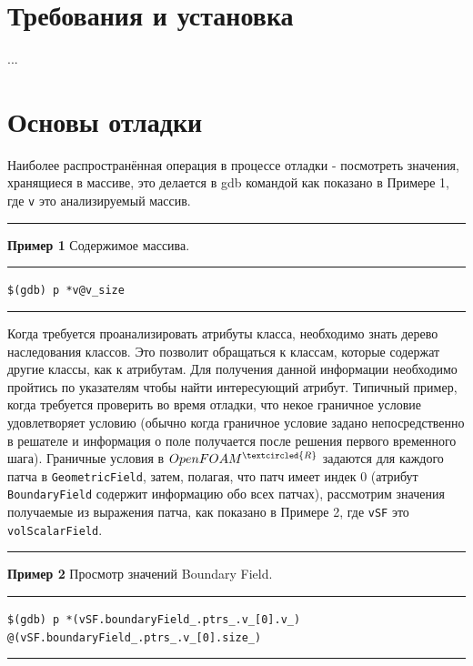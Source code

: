 \documentclass[a4paper,10pt]{book}
\begin{document}
                                                                                                            

\chapter{Требования и установка}

...

\chapter{Основы отладки}
Наиболее распространённая операция в процессе отладки - посмотреть значения, хранящиеся в массиве, это делается в gdb командой как
показано в Примере 1, где \texttt{v} это анализируемый массив.
\vspace{2 mm}

\hrule\smallskip
\textbf{Пример 1} Содержимое массива.
\smallskip\hrule
\vspace{2 mm}
\texttt{\$(gdb) p *v@v\_size}
\vspace{2 mm}
\smallskip\hrule
\vspace{2 mm}

Когда требуется проанализировать атрибуты класса, необходимо знать дерево наследования классов. Это позволит обращаться
к классам, которые содержат другие классы, как к атрибутам. Для получения данной информации необходимо пройтись по указателям
чтобы найти интересующий атрибут. Типичный пример, когда требуется проверить во время отладки, что некое граничное условие
удовлетворяет условию (обычно когда граничное условие задано непосредственно в решателе и информация о поле получается после решения
первого временного шага). Граничные условия в $OpenFOAM^{\tiny\textcircled{R}}$ задаются для каждого патча в \texttt{GeometricField},
 затем, полагая, что патч имеет индек 0 (атрибут \texttt{BoundaryField} содержит информацию обо всех патчах), рассмотрим значения
получаемые из выражения патча, как показано в Примере 2, где \texttt{vSF} это \texttt{volScalarField}.

\vspace{2 mm}
\hrule\smallskip
\textbf{Пример 2} Просмотр значений Boundary Field.
\smallskip\hrule
\vspace{2 mm}
\texttt{\$(gdb) p *(vSF.boundaryField\_.ptrs\_.v\_[0].v\_) \\
\hspace*{15 mm}@(vSF.boundaryField\_.ptrs\_.v\_[0].size\_)}
\vspace{2 mm}
\smallskip\hrule
\vspace{2 mm}
\end{document}
